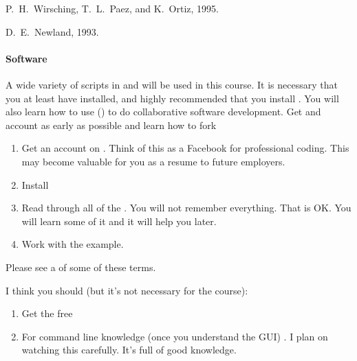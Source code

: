 \documentclass[letterpaper,10pt,english]{sphinxmanual}
\begin{document}
 P. H. Wirsching, T. L. Paez,
and K. Ortiz, 1995.

 D. E. Newland, 1993.


\paragraph{Software}
\label{\detokenize{classes/ME7690Syll:software}}
A wide variety of scripts in  and  will be used in this course. It is necessary that you at least have  installed, and highly recommended that you install . You will also learn how to use   () to do collaborative software development. Get and account as early as possible and learn how to fork
\begin{enumerate}
\item {} 
Get an account on . Think of this as a Facebook for professional coding. This may become valuable for you as a resume to future employers.

\item {} 
Install 

\item {} 
Read through all of the . You will not remember everything. That is OK. You will learn some of it and it will help you later.

\item {} 
Work with the  example.

\end{enumerate}

Please see a  of some of these terms.

I think you should (but it’s not necessary for the course):
\begin{enumerate}
\item {} 
Get the free 

\item {} 
For command line knowledge (once you understand the GUI) . I plan on watching this carefully. It’s full of good knowledge.

\end{enumerate}
\end{document}
